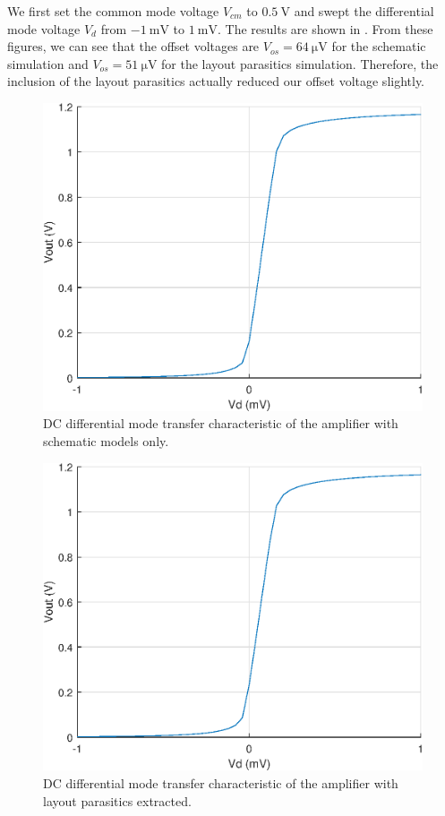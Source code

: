 \documentclass[journal,hidelinks]{IEEEtran}
\begin{document}
We first set the common mode voltage $V_{cm}$ to $\SI{0.5}{\volt}$ and swept the differential mode voltage $V_d$ from $\SI{-1}{\milli\volt}$ to $\SI{1}{\milli\volt}$. The results are shown in . From these figures, we can see that the offset voltages are $V_{os} = \SI{64}{\micro\volt}$ for the schematic simulation and $V_{os} = \SI{51}{\micro\volt}$ for the layout parasitics simulation. Therefore, the inclusion of the layout parasitics actually reduced our offset voltage slightly.

\begin{figure}[!htb]
  \centering
  \includegraphics[width=\columnwidth]{figures/schematic/dc_dm.eps}
  \caption{DC differential mode transfer characteristic of the amplifier with schematic models only.}
  \label{fig:sch_dc_dm}
\end{figure}

\begin{figure}[!htb]
  \centering
  \includegraphics[width=\columnwidth]{figures/layout/dc_dm.eps}
  \caption{DC differential mode transfer characteristic of the amplifier with layout parasitics extracted.}
  \label{fig:lay_dc_dm}
\end{figure}
\end{document}
